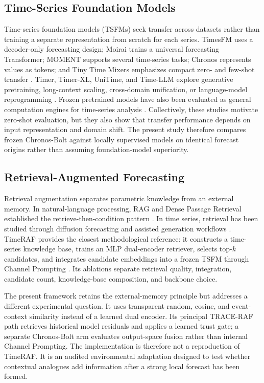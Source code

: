 \documentclass{ieeeaccess}
\begin{document}
\subsection{Time-Series Foundation Models}
Time-series foundation models (TSFMs) seek transfer across datasets rather than
training a separate representation from scratch for each series. TimesFM uses a
decoder-only forecasting design; Moirai trains a universal forecasting
Transformer; MOMENT supports several time-series tasks; Chronos represents
values as tokens; and Tiny Time Mixers emphasizes compact zero- and few-shot
transfer
\cite{das2024timesfm,woo2024moirai,goswami2024moment,ansari2024chronos,ekambaram2024ttm}.
Timer, Timer-XL, UniTime, and Time-LLM explore generative pretraining,
long-context scaling, cross-domain unification, or language-model reprogramming
\cite{liu2024timer,liu2025timerxl,liu2024unitime,jin2024timellm}. Frozen
pretrained models have also been evaluated as general computation engines for
time-series analysis \cite{zhou2023onefitsall}. Collectively, these studies
motivate zero-shot evaluation, but they also show that transfer performance
depends on input representation and domain shift. The present study therefore
compares frozen Chronos-Bolt against locally supervised models on identical
forecast origins rather than assuming foundation-model superiority.

\subsection{Retrieval-Augmented Forecasting}
Retrieval augmentation separates parametric knowledge from an external memory.
In natural-language processing, RAG and Dense Passage Retrieval established the
retrieve-then-condition pattern \cite{lewis2020rag,karpukhin2020dpr}. In time
series, retrieval has been studied through diffusion forecasting and assisted
generation workflows \cite{liu2024ratd,ang2024tsgassist}. TimeRAF provides the
closest methodological reference: it constructs a time-series knowledge base,
trains an MLP dual-encoder retriever, selects top-$k$ candidates, and integrates
candidate embeddings into a frozen TSFM through Channel Prompting
\cite{zhang2025timeraf}. Its ablations separate retrieval quality, integration,
candidate count, knowledge-base composition, and backbone choice.

The present framework retains the external-memory principle but addresses a
different experimental question. It uses transparent random, cosine, and
event-context similarity instead of a learned dual encoder. Its principal
TRACE-RAF path retrieves historical model residuals and applies a learned trust
gate; a separate Chronos-Bolt arm evaluates output-space fusion rather than
internal Channel Prompting. The implementation is therefore not a reproduction
of TimeRAF. It is an audited environmental adaptation designed to test whether
contextual analogues add information after a strong local forecast has been
formed.
\end{document}
